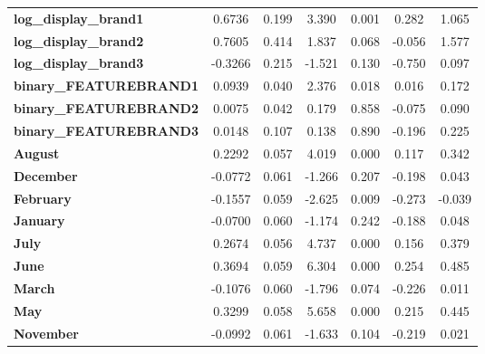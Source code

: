 \documentclass[a4paper,11pt]{article}
\begin{document}
\begin{center}
\begin{tabular}{lcccccc}
\textbf{log\_display\_brand1}  &       0.6736  &        0.199     &     3.390  &         0.001        &        0.282    &        1.065     \\
\textbf{log\_display\_brand2}  &       0.7605  &        0.414     &     1.837  &         0.068        &       -0.056    &        1.577     \\
\textbf{log\_display\_brand3}  &      -0.3266  &        0.215     &    -1.521  &         0.130        &       -0.750    &        0.097     \\
\textbf{binary\_FEATUREBRAND1} &       0.0939  &        0.040     &     2.376  &         0.018        &        0.016    &        0.172     \\
\textbf{binary\_FEATUREBRAND2} &       0.0075  &        0.042     &     0.179  &         0.858        &       -0.075    &        0.090     \\
\textbf{binary\_FEATUREBRAND3} &       0.0148  &        0.107     &     0.138  &         0.890        &       -0.196    &        0.225     \\
\textbf{August}                &       0.2292  &        0.057     &     4.019  &         0.000        &        0.117    &        0.342     \\
\textbf{December}              &      -0.0772  &        0.061     &    -1.266  &         0.207        &       -0.198    &        0.043     \\
\textbf{February}              &      -0.1557  &        0.059     &    -2.625  &         0.009        &       -0.273    &       -0.039     \\
\textbf{January}               &      -0.0700  &        0.060     &    -1.174  &         0.242        &       -0.188    &        0.048     \\
\textbf{July}                  &       0.2674  &        0.056     &     4.737  &         0.000        &        0.156    &        0.379     \\
\textbf{June}                  &       0.3694  &        0.059     &     6.304  &         0.000        &        0.254    &        0.485     \\
\textbf{March}                 &      -0.1076  &        0.060     &    -1.796  &         0.074        &       -0.226    &        0.011     \\
\textbf{May}                   &       0.3299  &        0.058     &     5.658  &         0.000        &        0.215    &        0.445     \\
\textbf{November}              &      -0.0992  &        0.061     &    -1.633  &         0.104        &       -0.219    &        0.021     \\

\end{tabular}
\end{center}
\end{document}
